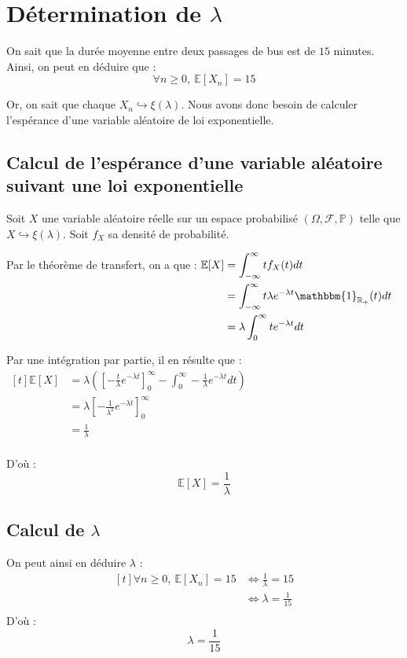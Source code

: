 \documentclass[a4paper, titlepage]{livret} %
\begin{document}
		\section{Détermination de $\lambda$}
			On sait que la durée moyenne entre deux passages de bus est de $15$ minutes.
			Ainsi, on peut en déduire que :
			\[
				\forall n \geq 0, \ \mathbb{E}[X_{n}] = 15
			\]

			Or, on sait que chaque $X_{n} \hookrightarrow \xi(\lambda)$.
			Nous avons donc besoin de calculer l'espérance d'une variable aléatoire de loi exponentielle.

			\subsection{Calcul de l'espérance d'une variable aléatoire suivant une loi exponentielle}
				Soit $X$ une variable aléatoire réelle sur un espace probabilisé $(\Omega, \mathcal{F}, \mathbb{P})$ telle que $X \hookrightarrow \xi(\lambda)$.
				Soit $f_{X}$ sa densité de probabilité.
				
				Par le théorème de transfert, on a que :
				$\begin{aligned}[t]
   					\mathbb{E}[X] & = \int_{-\infty}^{\infty} t f_{X}(t)dt \\
                                  & = \int_{-\infty}^{\infty} t \lambda e^{-\lambda t} \mathbbm{1}_{\mathbb{R}_{+}} (t) dt \\
                                  & = \lambda \int_{0}^{\infty} t e^{-\lambda t} dt \\
 				\end{aligned}$

 				Par une intégration par partie, il en résulte que :
 				$\begin{aligned}[t]
   					\mathbb{E}[X] & = \lambda \left(\left[ -\frac{t}{\lambda} e^{-\lambda t}\right]_{0}^{\infty} - 
   										\int_{0}^{\infty} -\frac{1}{\lambda} e^{-\lambda t} dt\right) \\
                                  & = \lambda \left[-\frac{1}{\lambda^{2}} e^{-\lambda t}\right]_{0}^{\infty} \\
                                  & = \frac{1}{\lambda} \\
 				\end{aligned}$

 				D'où :
 				\[\boxed{
 					\mathbb{E}[X] = \frac{1}{\lambda}
 				}\]
 			\subsection{Calcul de $\lambda$}
				On peut ainsi en déduire $\lambda$ :
				\[\begin{aligned}[t]
					\forall n \geq 0, \ \mathbb{E}[X_{n}] = 15 & \Leftrightarrow \frac{1}{\lambda} = 15 \\
										   				& \Leftrightarrow \lambda = \frac{1}{15} \\
				\end{aligned}\]
				D'où :
 				\[\boxed{
 					\lambda = \frac{1}{15}
 				}\]
\end{document}
